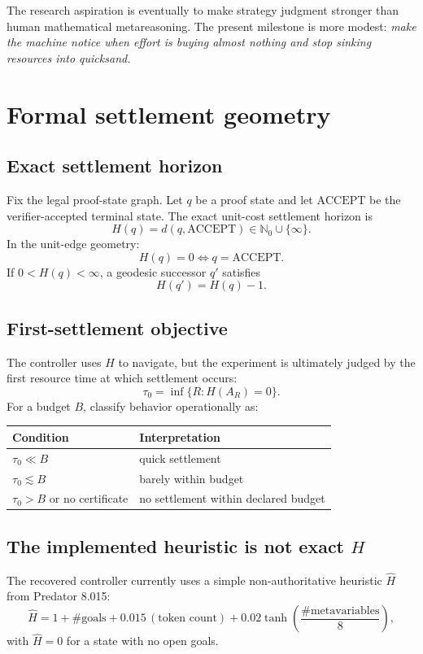 \documentclass[11pt]{article}
\newcommand{\accept}{\mathrm{ACCEPT}}
\begin{document}
The research aspiration is eventually to make strategy judgment stronger than human mathematical metareasoning. The present milestone is more modest: \emph{make the machine notice when effort is buying almost nothing and stop sinking resources into quicksand.}

\section{Formal settlement geometry}

\subsection{Exact settlement horizon}

Fix the legal proof-state graph. Let $q$ be a proof state and let $\accept$ be the verifier-accepted terminal state. The exact unit-cost settlement horizon is
\[
H(q)=d(q,\accept)\in\mathbb N_0\cup\{\infty\}.
\]
In the unit-edge geometry:
\[
H(q)=0\iff q=\accept.
\]
If $0<H(q)<\infty$, a geodesic successor $q'$ satisfies
\[
H(q')=H(q)-1.
\]

\subsection{First-settlement objective}

The controller uses $H$ to navigate, but the experiment is ultimately judged by the first resource time at which settlement occurs:
\[
\boxed{\tau_0=\inf\{R:H(A_R)=0\}.}
\]
For a budget $B$, classify behavior operationally as:
\begin{center}
\begin{tabular}{ll}
\toprule
Condition & Interpretation \\
\midrule
$\tau_0\ll B$ & quick settlement \\
$\tau_0\lesssim B$ & barely within budget \\
$\tau_0>B$ or no certificate & no settlement within declared budget \\
\bottomrule
\end{tabular}
\end{center}

\subsection{The implemented heuristic is not exact $H$}

The recovered controller currently uses a simple non-authoritative heuristic $\widehat H$ from Predator 8.015:
\[
\widehat H
=1+\#\text{goals}
+0.015\,(\text{token count})
+0.02\tanh\!\left(\frac{\#\text{metavariables}}{8}\right),
\]
with $\widehat H=0$ for a state with no open goals.
\end{document}
